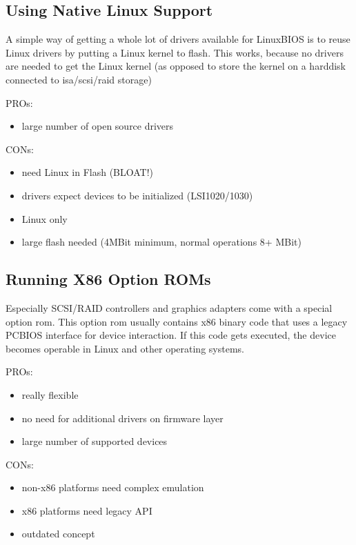 \documentclass[titlepage,12pt]{article}
\begin{document}
\subsection{Using Native Linux Support}

A simple way of getting a whole lot of drivers available for LinuxBIOS
is to reuse Linux drivers by putting a Linux kernel to flash. This
works, because no drivers are needed to get the Linux kernel (as opposed
to store the kernel on a harddisk connected to isa/scsi/raid storage)

PROs:
 \begin{itemize}
 \item large number of open source drivers
 \end{itemize}

CONs:
 \begin{itemize}
 \item need Linux in Flash (BLOAT!)
 \item drivers expect devices to be initialized (LSI1020/1030)
 \item Linux only
 \item large flash needed (4MBit minimum, normal operations 8+ MBit)
 \end{itemize}


\subsection{Running X86 Option ROMs}

Especially SCSI/RAID controllers and graphics adapters come with a
special option rom. This option rom usually contains x86 binary code
that uses a legacy PCBIOS interface for device interaction. If this code
gets executed, the device becomes operable in Linux and other operating
systems.

PROs:
 \begin{itemize}
 \item really flexible
 \item no need for additional drivers on firmware layer
 \item large number of supported devices
 \end{itemize}

CONs:
 \begin{itemize}
 \item non-x86 platforms need complex emulation
 \item x86 platforms need legacy API
 \item outdated concept
 \end{itemize}
\end{document}
